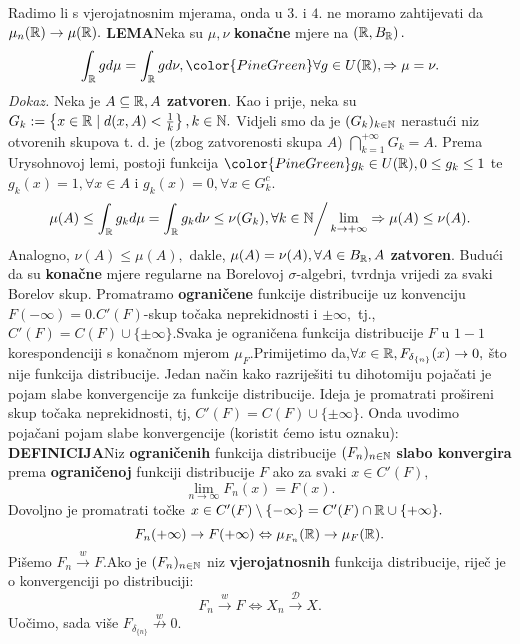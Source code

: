 \documentclass{article}
\begin{document}
\begin{itemize}
\end{itemize}
Radimo li s vjerojatnosnim mjerama, onda u \(3.\) i \(4.\) ne moramo zahtijevati da \(\mu_n(\Bbb R)\to\mu(\Bbb R).\)\newline\newline
\textbf{LEMA}\newline Neka su \(\mu,\nu\) \textbf{konačne} mjere na \(\left(\Bbb R,B_{\Bbb R}\right).\) \[\int_{\Bbb R}gd\mu=\int_{\Bbb R}gd\nu,{\color{PineGreen}\forall g\in U(\Bbb R)},\Rightarrow \mu=\nu.\]
\textit{Dokaz.}\newline
Neka je \(A\subseteq\Bbb R, A\) \textbf{zatvoren}. Kao i prije, neka su \(G_k:=\left\{x\in\Bbb R\mid d(x,A)<\frac1k\right\},k\in\Bbb N.\) Vidjeli smo da je \((G_k)_{k\in\Bbb N}\) nerastući niz otvorenih skupova t. d. je (zbog zatvorenosti skupa \(A\)) \(\bigcap_{k=1}^{+\infty}G_k=A.\) Prema Urysohnovoj lemi, postoji funkcija \({\color{PineGreen}g_k\in U(\Bbb R)},0\le g_k\le 1\) te \(g_k(x)=1,\forall x\in A\) i \(g_k(x)=0,\forall x\in G_k^c.\)  \[\mu(A)\le\int_{\Bbb R}g_kd\mu=\int_{\Bbb R}g_kd\nu\le\nu(G_k),\forall k\in\Bbb N\bigg/\lim_{k\to+\infty}\Rightarrow\mu(A)\le\nu(A).\] Analogno, \(\nu(A)\le\mu(A),\) dakle, \(\mu(A)=\nu(A),\forall A\in B_{\Bbb R},A\) \textbf{zatvoren}. Budući da su \textbf{konačne} mjere regularne na Borelovoj \(\sigma\)-algebri, tvrdnja vrijedi za svaki Borelov skup.\newline\newline
Promatramo \textbf{ograničene} funkcije distribucije uz konvenciju \(F(-\infty)=0.\)\newline \(C'(F)\)-skup točaka neprekidnosti i \(\pm\infty,\) tj., \(C'(F)=C(F)\cup\{\pm\infty\}.\)\newline Svaka je ograničena funkcija distribucije \(F\) u \(1-1\) korespondenciji s konačnom mjerom \(\mu_F.\)\newline Primijetimo da,\(\forall x\in\Bbb R, F_{\delta_{\{n\}}}(x)\to0,\) što nije funkcija distribucije. Jedan način kako razriješiti tu dihotomiju pojačati je pojam slabe konvergencije za funkcije distribucije. Ideja je promatrati prošireni skup točaka neprekidnosti, tj, \(C'(F)=C(F)\cup\{\pm\infty\}.\) Onda uvodimo pojačani pojam slabe konvergencije (koristit ćemo istu oznaku):\newline\newline
\textbf{DEFINICIJA}\newline Niz \textbf{ograničenih} funkcija distribucije \((F_n)_{n\in\Bbb N}\) \textbf{slabo konvergira} prema \textbf{ograničenoj} funkciji distribucije \(F\) ako za svaki \(x\in C'(F),\) \[\lim_{n\to\infty}F_n(x)=F(x).\] Dovoljno je promatrati točke \(x\in C'(F)\setminus\{-\infty\}=C'(F)\cap\Bbb R\cup\{+\infty\}.\)  \[F_n(+\infty)\to F(+\infty)\Leftrightarrow\mu_{F_n}(\Bbb R)\to\mu_F(\Bbb R).\] Pišemo \(F_n\overset{w}{\longrightarrow}F.\)\newline Ako je \((F_n)_{n\in\Bbb N}\) niz \textbf{vjerojatnosnih} funkcija distribucije, riječ je o konvergenciji po distribuciji: \[F_n\overset{w}{\longrightarrow}F\Leftrightarrow X_n\overset{\mathcal D}{\longrightarrow}X.\] Uočimo, sada više \(F_{\delta_{\{n\}}}\overset{w}{\not\longrightarrow}0.\)\newline\newline
\end{document}
